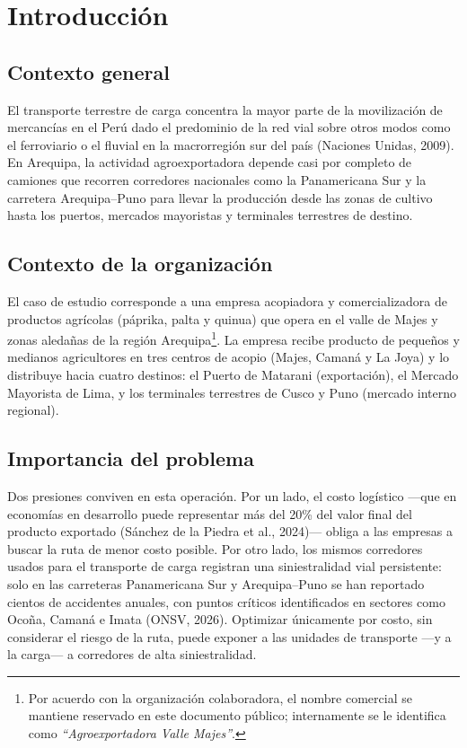 \documentclass[11pt,a4paper]{article}
\begin{document}
\newpage
\tableofcontents
\newpage

\section{Introducci\'on}

\subsection{Contexto general}
El transporte terrestre de carga concentra la mayor parte de la movilizaci\'on de mercanc\'ias en el Per\'u dado el predominio de la red vial sobre otros modos como el ferroviario o el fluvial en la macrorregi\'on sur del pa\'is (Naciones Unidas, 2009). En Arequipa, la actividad agroexportadora depende casi por completo de camiones que recorren corredores nacionales como la Panamericana Sur y la carretera Arequipa--Puno para llevar la producci\'on desde las zonas de cultivo hasta los puertos, mercados mayoristas y terminales terrestres de destino.

\subsection{Contexto de la organizaci\'on}
El caso de estudio corresponde a una empresa acopiadora y comercializadora de productos agr\'icolas (p\'aprika, palta y quinua) que opera en el valle de Majes y zonas aleda\~nas de la regi\'on Arequipa\footnote{Por acuerdo con la organizaci\'on colaboradora, el nombre comercial se mantiene reservado en este documento p\'ublico; internamente se le identifica como \emph{``Agroexportadora Valle Majes''}.}. La empresa recibe producto de peque\~nos y medianos agricultores en tres centros de acopio (Majes, Caman\'a y La Joya) y lo distribuye hacia cuatro destinos: el Puerto de Matarani (exportaci\'on), el Mercado Mayorista de Lima, y los terminales terrestres de Cusco y Puno (mercado interno regional).

\subsection{Importancia del problema}
Dos presiones conviven en esta operaci\'on. Por un lado, el costo log\'istico ---que en econom\'ias en desarrollo puede representar m\'as del 20\% del valor final del producto exportado (S\'anchez de la Piedra et al., 2024)--- obliga a las empresas a buscar la ruta de menor costo posible. Por otro lado, los mismos corredores usados para el transporte de carga registran una siniestralidad vial persistente: solo en las carreteras Panamericana Sur y Arequipa--Puno se han reportado cientos de accidentes anuales, con puntos cr\'iticos identificados en sectores como Oco\~na, Caman\'a e Imata (ONSV, 2026). Optimizar \'unicamente por costo, sin considerar el riesgo de la ruta, puede exponer a las unidades de transporte ---y a la carga--- a corredores de alta siniestralidad.
\end{document}
